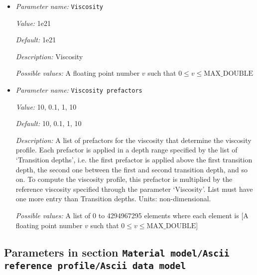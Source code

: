 \begin{itemize}
{\it Description:} Whether to use the TALA instead of the ALA approximation.


{\it Possible values:} A boolean value (true or false)
\item {\it Parameter name:} {\tt Viscosity}
\label{parameters:Material model/Ascii reference profile/Viscosity}


{\it Value:} 1e21


{\it Default:} 1e21


{\it Description:} Viscosity


{\it Possible values:} A floating point number $v$ such that $0 \leq v \leq \text{MAX\_DOUBLE}$
\item {\it Parameter name:} {\tt Viscosity prefactors}
\label{parameters:Material model/Ascii reference profile/Viscosity prefactors}


{\it Value:} 10, 0.1, 1, 10


{\it Default:} 10, 0.1, 1, 10


{\it Description:} A list of prefactors for the viscosity that determine the viscosity profile. Each prefactor is applied in a depth range specified by the list of `Transition depths', i.e. the first prefactor is applied above the first transition depth, the second one between the first and second transition depth, and so on. To compute the viscosity profile, this prefactor is multiplied by the reference viscosity specified through the parameter `Viscosity'. List must have one more entry than Transition depths. Units: non-dimensional.


{\it Possible values:} A list of 0 to 4294967295 elements where each element is [A floating point number $v$ such that $0 \leq v \leq \text{MAX\_DOUBLE}$]
\end{itemize}



\subsection{Parameters in section \tt Material model/Ascii reference profile/Ascii data model}
\label{parameters:Material_20model/Ascii_20reference_20profile/Ascii_20data_20model}

